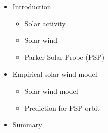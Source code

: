 {
\begin{frame}[c]{}{}
	\begin{columns}[c]

		
		\Large
		\begin{itemize}
			\item Introduction
			\begin{itemize}
				\item \large Solar activity
				\item Solar wind
				\item Parker Solar Probe (PSP)
			\end{itemize}
			\item Empirical solar wind model
			\begin{itemize}
				\item \large Solar wind model
				\item Prediction for PSP orbit
			\end{itemize}
			\item Summary
		\end{itemize}
	\end{columns}
\end{frame}
}

% 	
% 		
% 		
% 	
% 		


